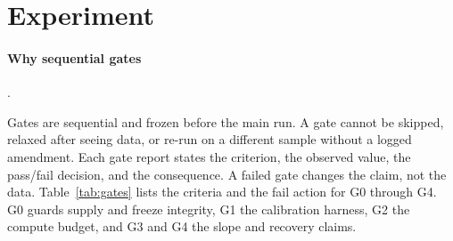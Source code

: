 \documentclass[a4paper,fleqn]{cas-sc}
\begin{document}
\section{Experiment}\label{sec:experiment}

\paragraph{Why sequential gates}.\

Gates are sequential and frozen before the main run. A gate cannot be skipped, relaxed after
seeing data, or re-run on a different sample without a logged amendment. Each gate report states
the criterion, the observed value, the pass/fail decision, and the consequence. A failed gate
changes the claim, not the data. Table~\ref{tab:gates} lists the criteria and the fail action for
G0 through G4. G0 guards supply and freeze integrity, G1 the calibration harness, G2 the compute
budget, and G3 and G4 the slope and recovery claims.
\end{document}
